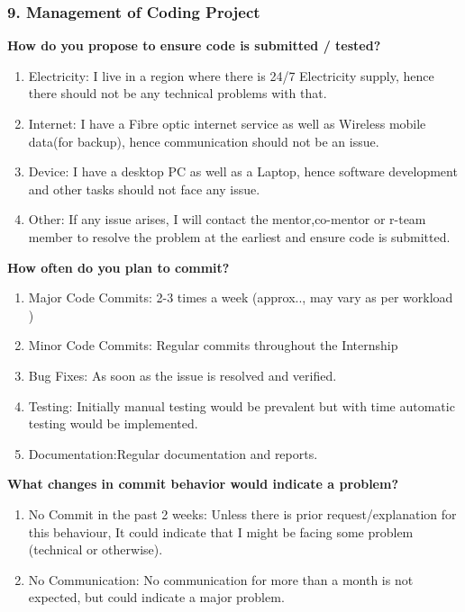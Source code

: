 \documentclass[12pt]{article}
\begin{document}
\subsubsection{9. Management of Coding Project}
{\large\bfseries How do you propose to ensure code is submitted / tested?}
\begin{enumerate}[label = {  \color{MediumBlue} \textbf{\arabic*. }},align=left]
 \item {\color{MediumBlue} Electricity}: I live in a region where there is 24/7 Electricity supply, hence there should not be any technical problems with that. 
 \item {\color{MediumBlue} Internet}: I have a Fibre optic internet service as well as Wireless mobile data(for backup), hence communication should not be an issue.
 \item {\color{MediumBlue} Device}: I have a desktop PC as well as a Laptop, hence software development and other tasks should not face any issue.
 \item {\color{MediumBlue} Other}: If any issue arises, I will contact the mentor,co-mentor or r-team member to resolve the problem at the earliest and ensure code is submitted.
\end{enumerate}
{\large\bfseries How often do you plan to commit?}
\begin{enumerate}[label = {  \color{MediumBlue} \textbf{\arabic*. }},align=left]
 \item {\color{MediumBlue} Major Code Commits}: 2-3 times a week (approx.., may vary as per workload )
 \item {\color{MediumBlue} Minor Code Commits}: Regular commits throughout the Internship
 \item {\color{MediumBlue} Bug Fixes}: As soon as the issue is resolved and verified. 
 \item {\color{MediumBlue} Testing}: Initially manual testing would be prevalent but with time automatic testing would be implemented.
 \item {\color{MediumBlue} Documentation}:Regular documentation and reports.
\end{enumerate}
{\large\bfseries What changes in commit behavior would indicate a problem?}\\
\begin{enumerate}[label = {  \color{MediumBlue} \textbf{\arabic*. }},align=left]
 \item {\color{MediumBlue} No Commit in the past 2 weeks}: Unless there is prior request/explanation for this behaviour, It could indicate that I might be facing some problem (technical or otherwise).
\item{\color{MediumBlue} No Communication}: No communication for more than a month is not expected, but could indicate a major problem.

\end{enumerate}
\end{document}
